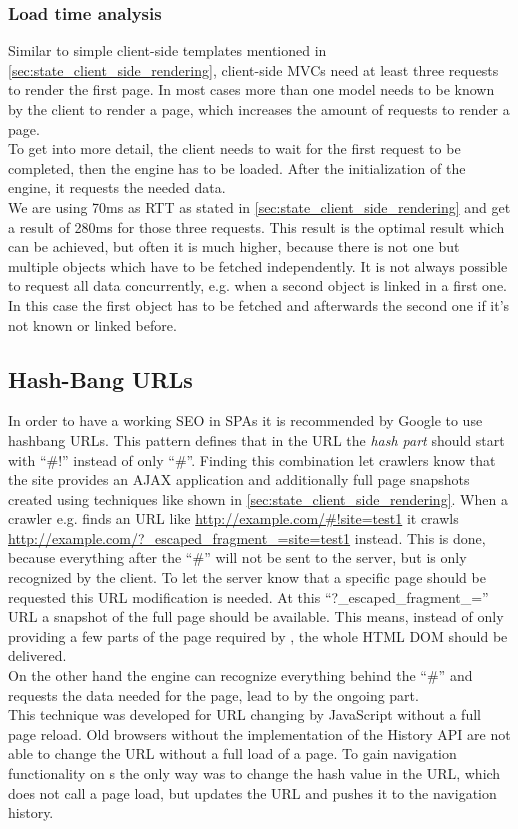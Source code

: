 \subsubsection{Load time analysis}
Similar to simple client-side templates mentioned in \ref{sec:state_client_side_rendering}, client-side MVCs need at least three requests to render the first page.
In most cases more than one model needs to be known by the client to render a page, which increases the amount of requests to render a page.
\\
To get into more detail, the client needs to wait for the first request to be completed, then the \ajax{} engine has to be loaded.
After the initialization of the \ajax{} engine, it requests the needed data.
\\
We are using 70ms as RTT as stated in \ref{sec:state_client_side_rendering} and get a result of 280ms for those three requests.
This result is the optimal result which can be achieved, but often it is much higher, because there is not one but multiple objects which have to be fetched independently.
It is not always possible to request all data concurrently, e.g. when a second object is linked in a first one.
In this case the first object has to be fetched and afterwards the second one if it's not known or linked before.

\subsection{Hash-Bang URLs\label{hashbangurls}}
In order to have a working SEO in SPAs it is recommended by Google to use hashbang URLs.
This pattern defines that in the URL the \emph{hash part} should start with \enquote{\#!} instead of only \enquote{\#}.
Finding this combination let crawlers know that the site provides an AJAX application and additionally full page snapshots created using techniques like shown in \ref{sec:state_client_side_rendering}.
When a crawler e.g. finds an URL like \url{http://example.com/\#!site=test1} it crawls \newline \url{http://example.com/?\_escaped\_fragment\_=site=test1} instead.
This is done, because everything after the \enquote{\#} will not be sent to the server, but is only recognized by the client.
To let the server know that a specific page should be requested this URL modification is needed.
At this \enquote{?\_escaped\_fragment\_=} URL a snapshot of the full page should be available.
This means, instead of only providing a few parts of the page required by \ajax{}, the whole HTML DOM should be delivered.
\\
On the other hand the \ajax{} engine can recognize everything behind the \enquote{\#} and requests the data needed for the page, lead to by the ongoing part.
\\
This technique was developed for URL changing by JavaScript without a full page reload.
Old browsers without the implementation of the History API are not able to change the URL without a full load of a page.
To gain navigation functionality on \singlePageApplication{}s the only way was to change the hash value in the URL, which does not call a page load, but updates the URL and pushes it to the navigation history.


